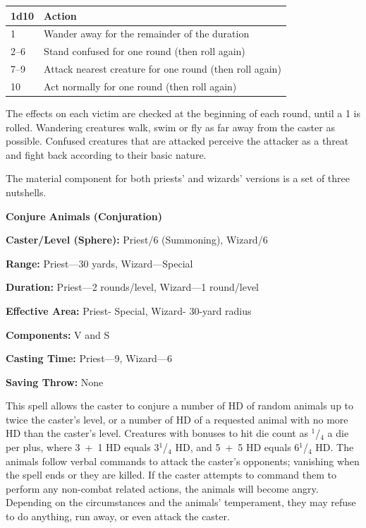 \begin{multicols}{2}
\noindent
\begin{tabular}{|p{}|p{}|}
\hline
1d10	& Action \\
\hline\hline
\rowcolor[gray]{.9}1	& Wander away for the remainder of the duration \\
2--6	& Stand confused for one round (then roll again) \\
\rowcolor[gray]{.9}7--9	& Attack nearest creature for one round (then roll again) \\
10	& Act normally for one round (then roll again) \\
\hline
\end{tabular}

The effects on each victim are checked at the beginning of each round, until a 1 is rolled.  Wandering creatures walk, swim or fly as far away from the caster as possible.  Confused creatures that are attacked perceive the attacker as a threat and fight back according to their basic nature.  

The material component for both priests' and wizards' versions is a set of three nutshells.

\vspace{1em}

\noindent
\begin{minipage}{\columnwidth}

\noindent \textbf{Conjure Animals (Conjuration)}

\noindent \textbf{Caster/Level (Sphere):} Priest/6 (Summoning), Wizard/6

\noindent \textbf{Range:} Priest---30 yards, Wizard---Special

\noindent \textbf{Duration:} Priest---2 rounds/level, Wizard---1 round/level 

\noindent \textbf{Effective Area:} Priest- Special, Wizard- 30-yard radius

\noindent \textbf{Components:} V and S

\noindent \textbf{Casting Time:} Priest---9, Wizard---6

\noindent \textbf{Saving Throw:} None

\end{minipage}

This spell allows the caster to conjure a number of HD of random animals up to twice the caster's level, or a number of HD of a requested animal with no more HD than the caster's level.  Creatures with bonuses to hit die count as $^1$/$_4$ a die per plus, where 3~+~1 HD equals 3$^1$/$_4$ HD, and 5~+~5 HD equals 6$^1$/$_4$ HD.  The animals follow verbal commands to attack the caster's opponents; vanishing when the spell ends or they are killed.  If the caster attempts to command them to perform any non-combat related actions, the animals will become angry.  Depending on the circumstances and the animals' temperament, they may refuse to do anything, run away, or even attack the caster. 


\end{multicols}
